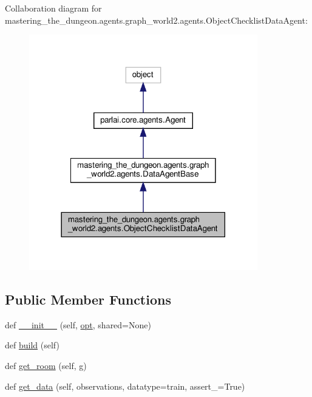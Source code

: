 Collaboration diagram for mastering\+\_\+the\+\_\+dungeon.\+agents.\+graph\+\_\+world2.\+agents.\+Object\+Checklist\+Data\+Agent\+:
\nopagebreak
\begin{figure}[H]
\begin{center}
\leavevmode
\includegraphics[width=282pt]{classmastering__the__dungeon_1_1agents_1_1graph__world2_1_1agents_1_1ObjectChecklistDataAgent__coll__graph}
\end{center}
\end{figure}
\subsection*{Public Member Functions}
\begin{DoxyCompactItemize}
\item 
def \hyperlink{classmastering__the__dungeon_1_1agents_1_1graph__world2_1_1agents_1_1ObjectChecklistDataAgent_a6fc3e58b206ddb4d89b6923b946d24ed}{\+\_\+\+\_\+init\+\_\+\+\_\+} (self, \hyperlink{classparlai_1_1core_1_1agents_1_1Agent_ab3b45d2754244608c75d4068b90cd051}{opt}, shared=None)
\item 
def \hyperlink{classmastering__the__dungeon_1_1agents_1_1graph__world2_1_1agents_1_1ObjectChecklistDataAgent_a3b35a576082b899a4883050a80bdd9dc}{build} (self)
\item 
def \hyperlink{classmastering__the__dungeon_1_1agents_1_1graph__world2_1_1agents_1_1ObjectChecklistDataAgent_a447df3fe38f1b40e63eb63a79210e1cb}{get\+\_\+room} (self, g)
\item 
def \hyperlink{classmastering__the__dungeon_1_1agents_1_1graph__world2_1_1agents_1_1ObjectChecklistDataAgent_a87401a423621be9422228f9f4e245bc2}{get\+\_\+data} (self, observations, datatype=\textquotesingle{}train\textquotesingle{}, assert\+\_\+=True)
\end{DoxyCompactItemize}
